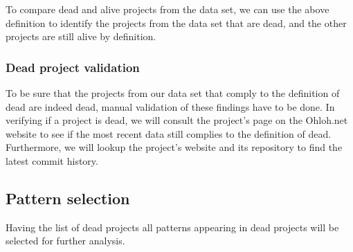 To compare dead and alive projects from the data set, we can use the above
definition to identify the projects from the data set that are dead, and the
other projects are still alive by definition.

\subsubsection{Dead project validation}
To be sure that the projects from our data set that comply to the definition of
dead are indeed dead, manual validation of these findings have to be done.
In verifying if a project is dead, we will consult the project's page on the
Ohloh.net website to see if the most recent data still complies to the
definition of dead. Furthermore, we will lookup the project's website and its
repository to find the latest commit history.

\subsection{Pattern selection}
Having the list of dead projects all patterns appearing in dead projects will be
selected for further analysis.

\begin{comment}
This section describes the methods used to answer the research questions. A
good structure of this section often follows the sub questions by providing a
method for each.

The research method can be based on the “Scientific method”, but more creative
solutions could be defined as well. In any case, the method needs a thorough
motivation grounded in theory in order to be acceptable.

As part of the method a number of hypotheses are described. These hypotheses
will be tested by the research, using the methods described here.

An important part of this section is validation. How will you evaluate and
validate the outcomes of the research? You can look at Paul Klint’s homepage
for examples of this section as
well\footnote{http://homepages.cwi.nl/~paulk/thesesMasterSoftwareEngineering/2006/RichardKettelerij.pdf}.
\end{comment}